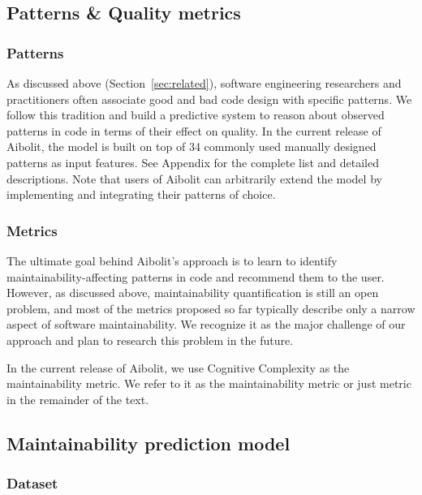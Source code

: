 \subsection{Patterns \& Quality metrics}
\label{sec:aibolit_patterns_metrics}

\subsubsection*{Patterns}

As discussed above (Section~\ref{sec:related}),
software engineering researchers and practitioners often associate
good and bad code design with specific patterns. We follow this tradition and
build a predictive system to reason about observed patterns in code in terms of their effect on quality.
In the current release of Aibolit, the model is built on top of 34
commonly used manually designed patterns as input features. See Appendix
for the complete list and detailed descriptions. Note that users of Aibolit
can arbitrarily extend the model by implementing and integrating their patterns
of choice.

\subsubsection*{Metrics}

The ultimate goal behind Aibolit's approach is to
learn to identify maintainability-affecting patterns in code and recommend them
to the user. However, as discussed above, maintainability quantification is
still an open problem, and most of the metrics proposed so far typically
describe only a narrow aspect of software maintainability. We recognize it as
the major challenge of our approach and plan to research this problem in the
future.

In the current release of Aibolit, we use Cognitive Complexity \citep{10.1145/3194164.3194186} as
the maintainability metric. We refer to it as the maintainability metric or just
metric in the remainder of the text.

\subsection{Maintainability prediction model}

\label{sec:maint_pred_model}

\subsubsection*{Dataset}

